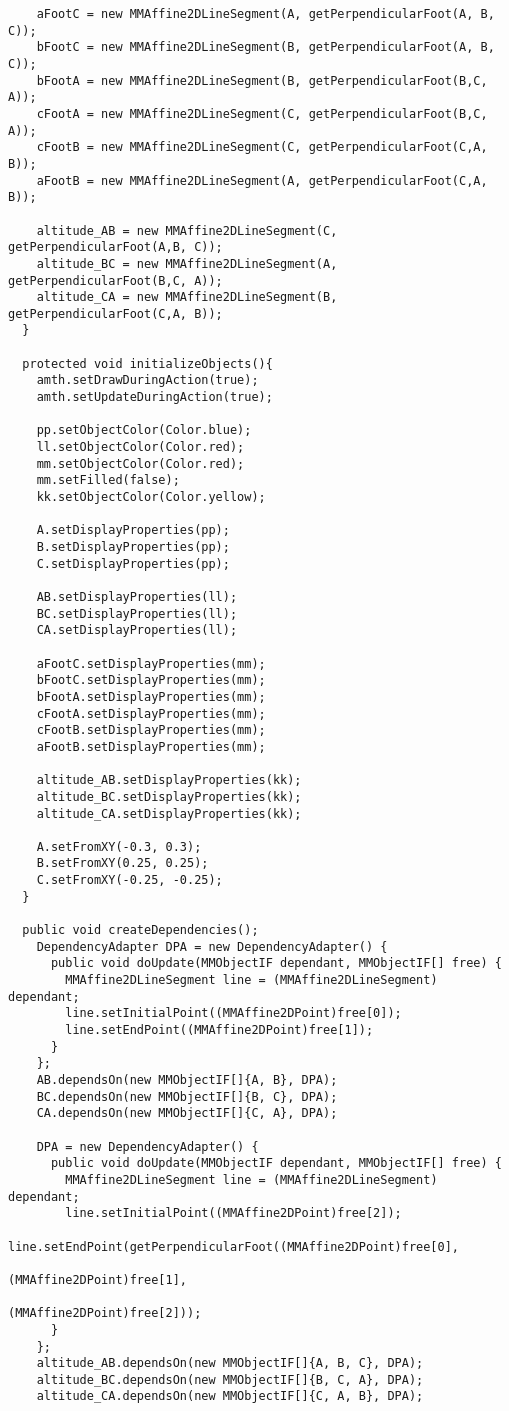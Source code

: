 \begin{footnotesize}
\begin{verbatim}
    aFootC = new MMAffine2DLineSegment(A, getPerpendicularFoot(A, B, C));
    bFootC = new MMAffine2DLineSegment(B, getPerpendicularFoot(A, B, C));
    bFootA = new MMAffine2DLineSegment(B, getPerpendicularFoot(B,C, A));
    cFootA = new MMAffine2DLineSegment(C, getPerpendicularFoot(B,C, A));
    cFootB = new MMAffine2DLineSegment(C, getPerpendicularFoot(C,A, B));
    aFootB = new MMAffine2DLineSegment(A, getPerpendicularFoot(C,A, B));
    
    altitude_AB = new MMAffine2DLineSegment(C, getPerpendicularFoot(A,B, C));
    altitude_BC = new MMAffine2DLineSegment(A, getPerpendicularFoot(B,C, A));
    altitude_CA = new MMAffine2DLineSegment(B, getPerpendicularFoot(C,A, B));
  }
  
  protected void initializeObjects(){
    amth.setDrawDuringAction(true);
    amth.setUpdateDuringAction(true);
    
    pp.setObjectColor(Color.blue);
    ll.setObjectColor(Color.red);
    mm.setObjectColor(Color.red);
    mm.setFilled(false);
    kk.setObjectColor(Color.yellow);
    
    A.setDisplayProperties(pp);
    B.setDisplayProperties(pp);
    C.setDisplayProperties(pp);
    
    AB.setDisplayProperties(ll);
    BC.setDisplayProperties(ll);
    CA.setDisplayProperties(ll);
    
    aFootC.setDisplayProperties(mm);
    bFootC.setDisplayProperties(mm);
    bFootA.setDisplayProperties(mm);
    cFootA.setDisplayProperties(mm);
    cFootB.setDisplayProperties(mm);
    aFootB.setDisplayProperties(mm);
    
    altitude_AB.setDisplayProperties(kk);
    altitude_BC.setDisplayProperties(kk);
    altitude_CA.setDisplayProperties(kk);
    
    A.setFromXY(-0.3, 0.3);
    B.setFromXY(0.25, 0.25);
    C.setFromXY(-0.25, -0.25);    
  }

  public void createDependencies();
    DependencyAdapter DPA = new DependencyAdapter() {
      public void doUpdate(MMObjectIF dependant, MMObjectIF[] free) {
        MMAffine2DLineSegment line = (MMAffine2DLineSegment) dependant;
        line.setInitialPoint((MMAffine2DPoint)free[0]);
        line.setEndPoint((MMAffine2DPoint)free[1]);
      }
    };
    AB.dependsOn(new MMObjectIF[]{A, B}, DPA);
    BC.dependsOn(new MMObjectIF[]{B, C}, DPA);
    CA.dependsOn(new MMObjectIF[]{C, A}, DPA);
    
    DPA = new DependencyAdapter() {
      public void doUpdate(MMObjectIF dependant, MMObjectIF[] free) {
        MMAffine2DLineSegment line = (MMAffine2DLineSegment) dependant;
        line.setInitialPoint((MMAffine2DPoint)free[2]);
        line.setEndPoint(getPerpendicularFoot((MMAffine2DPoint)free[0],
                                                (MMAffine2DPoint)free[1],
                                                (MMAffine2DPoint)free[2]));
      }
    };
    altitude_AB.dependsOn(new MMObjectIF[]{A, B, C}, DPA);
    altitude_BC.dependsOn(new MMObjectIF[]{B, C, A}, DPA);
    altitude_CA.dependsOn(new MMObjectIF[]{C, A, B}, DPA);
    

\end{verbatim}
\end{footnotesize}

